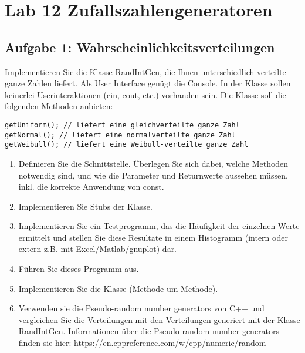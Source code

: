 \section{Lab 12 Zufallszahlengeneratoren}
\subsection{Aufgabe 1: Wahrscheinlichkeitsverteilungen}
Implementieren Sie die Klasse RandIntGen, die Ihnen unterschiedlich verteilte ganze Zahlen liefert. Als User Interface genügt die Console. In der Klasse sollen keinerlei Userinteraktionen (cin, cout, etc.) vorhanden sein. Die Klasse soll die folgenden Methoden anbieten:

\noindent
\texttt{getUniform(); // liefert eine gleichverteilte ganze Zahl\\
getNormal(); // liefert eine normalverteilte ganze Zahl\\
getWeibull(); // liefert eine Weibull‐verteilte ganze Zahl}

\begin{enumerate}
  \item Definieren Sie die Schnittstelle. Überlegen Sie sich dabei, welche Methoden notwendig sind, und wie die Parameter und Returnwerte aussehen müssen, inkl. die korrekte Anwendung von const.
  \item Implementieren Sie Stubs der Klasse.
  \item Implementieren Sie ein Testprogramm, das die Häufigkeit der einzelnen Werte ermittelt und stellen Sie diese Resultate in einem Histogramm (intern oder extern z.B. mit Excel/Matlab/gnuplot) dar.
  \item Führen Sie dieses Programm aus.
  \item Implementieren Sie die Klasse (Methode um Methode).
  \item Verwenden sie die Pseudo-random number generators von C++ und vergleichen Sie die Verteilungen mit den Verteilungen generiert mit der Klasse RandIntGen. Informationen über die Pseudo-random number generators finden sie hier: https://en.cppreference.com/w/cpp/numeric/random
\end{enumerate}


